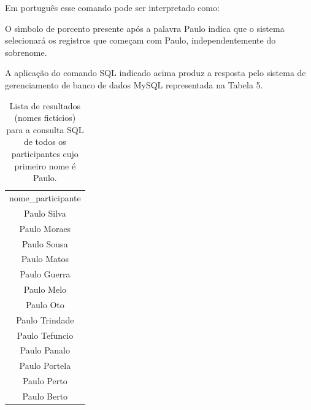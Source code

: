 \documentclass[
12pt,		%
openright,	%
twoside,  %
a4paper,			%
chapter=TITLE,		%
english,			%
french,				%
spanish,			%
brazil				%
]{USPSC-classe/USPSC}
\begin{document}
Em portugu\^es esse comando pode ser interpretado como:










\noindent\begin{center}\mbox{\centering{}}\end{center}


O s\'{\i}mbolo de porcento presente ap\'os a palavra \textquotedbl  Paulo \textquotedbl  indica que o sistema selecionar\'a os registros que come\c{c}am com \textquotedbl Paulo\textquotedbl , independentemente do sobrenome.









A aplica\c{c}\~ao do comando SQL indicado acima produz a resposta pelo sistema de gerenciamento de banco de dados MySQL representada na Tabela 5.













\begin{table}[htb]
\tiny
\caption{\label{fe3cd6334e1b9072eda70730e1734e26869d9c57}Lista de resultados (nomes fict\'{i}cios) para a consulta SQL de todos os participantes cujo primeiro nome \'e Paulo.}

\centering
\begin{tabular}{|c|}
\hline
nome\_participante        \\
Paulo Silva              \\
Paulo Moraes \\
Paulo Sousa \\
Paulo Matos \\
Paulo Guerra \\
Paulo Melo \\
Paulo Oto \\
Paulo Trindade \\
Paulo Tefuncio \\
Paulo Panalo \\
Paulo Portela \\
Paulo Perto \\
Paulo Berto \\
\hline
\end{tabular}
\end{table}
\end{document}
